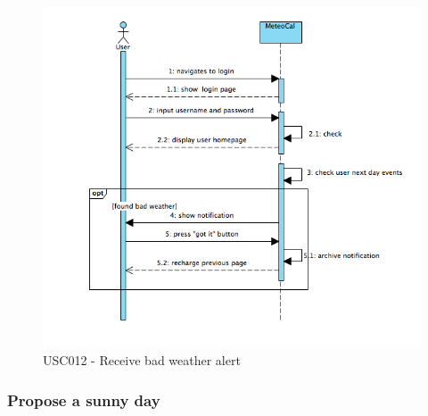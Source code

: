 \documentclass[10pt,a4paper,titlepage]{article}
\begin{document}
\begin{figure}[h]
\centering
\includegraphics[width=\linewidth]{./Sequence_diag/USC012.png}
\caption[USC012]{USC012 - Receive bad weather alert}
\label{fig:USC012}
\end{figure}

\clearpage
\subsubsection{Propose a sunny day} 
\end{document}
